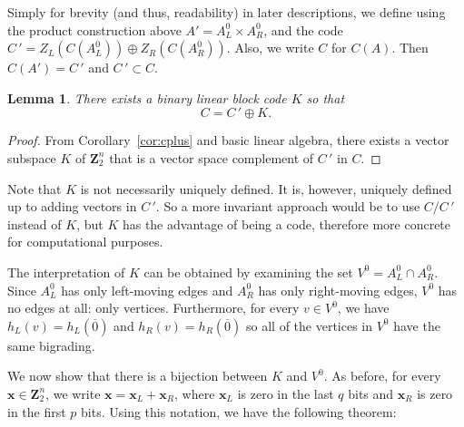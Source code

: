 \documentclass[12pt,twoside,singlespace]{article}
\numberwithin{equation}{section}
\newtheorem{lem}[equation]{Lemma}
\theoremstyle{definition}
\newcommand{\ZZ}{\mathbf{Z}}
\renewcommand{\vec}[1]{\mathbf{#1}}
\begin{document}
Simply for brevity (and thus, readability) in later descriptions, we define using the product construction above $A'=A_L^0\times A_R^0$, and the code $C\,'=Z_L(C(A_L^0))\oplus Z_R(C(A_R^0))$.  Also, we write $C$ for $C(A)$.  Then $C(A')=C\,'$ and $C\,'\subset C$.

\begin{lem}
\label{lem:existk}
There exists a binary linear block code $K$ so that
\[C=C\,' \oplus K.
\]
\end{lem}
\begin{proof}
From Corollary~\ref{cor:cplus} and basic linear algebra, there exists a vector subspace $K$ of $\ZZ_2^n$ that is a vector space complement of
$C\,'$ in $C$.
\end{proof}
Note that $K$ is not necessarily uniquely defined.  It is, however, uniquely defined up to adding vectors in $C\,'$.  So a more invariant approach would be to use $C/C\,'$ instead of $K$, but $K$ has the advantage of being a code, therefore more concrete for computational purposes.



The interpretation of $K$ can be obtained by examining the set $V^0=A_L^0\cap A_R^0$.  Since $A_L^0$ has only left-moving edges and $A_R^0$ has only right-moving edges, $V^0$ has no edges at all: only vertices.  Furthermore, for every $v\in V^0$, we have $h_L(v)=h_L(\overline{0})$ and $h_R(v)=h_R(\overline{0})$ so all of the vertices in $V^0$ have the same bigrading.

We now show that there is a bijection between $K$ and $V^0$. As before, for every $\vec{x}\in\ZZ_2^n$, we write $\vec{x}=\vec{x}_L+\vec{x}_R$, where $\vec{x}_L$ is zero in the last $q$ bits and $\vec{x}_R$ is zero in the first $p$ bits.  Using this notation, we have the following theorem:
\end{document}
